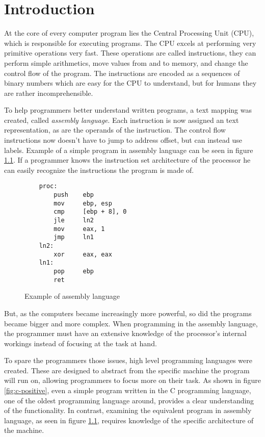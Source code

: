 \chapter{Introduction}
At the core of every computer program lies the Central Processing Unit (CPU),
which is responsible for executing programs. The CPU excels at performing very
primitive operations very fast. These operations are called instructions, they
can perform simple arithmetics, move values from and to memory, and change the
control flow of the program. The instructions are encoded as a sequences of
binary numbers which are easy for the CPU to understand, but for humans they
are rather incomprehensible.

To help programmers better understand written programs, a text mapping was
created, called \textit{assembly language}. Each instruction is now assigned an
text representation, as are the operands of the instruction. The control flow
instructions now doesn't have to jump to address offset, but can instead use
labels. Example of a simple program in assembly language can be seen in figure
\ref{fig:simple-assembly}. If a programmer knows the instruction set
architecture of the processor he can easily recognize the instructions the
program is made of.

\begin{figure}
    \begin{lstlisting}
    proc:
        push    ebp
        mov     ebp, esp
        cmp     [ebp + 8], 0
        jle     ln2
        mov     eax, 1
        jmp     ln1
    ln2:
        xor     eax, eax
    ln1:
        pop     ebp
        ret
    \end{lstlisting}
    \caption{Example of assembly language}
    \label{fig:simple-assembly}
\end{figure}

But, as the computers became increasingly more powerful, so did the programs
became bigger and more complex. When programming in the assembly language,
the programmer must have an extensive knowledge of the processor's internal
workings instead of focusing at the task at hand.

To spare the programmers those issues, high level programming languages were
created. These are designed to abstract from the specific machine the program
will run on, allowing programmers to focus more on their task. As shown in
figure \ref{fig:c-positive}, even a simple program written in the C programming
language, one of the oldest programming language around, provides a clear
understanding of the functionality. In contrast, examining the equivalent
program in assembly language, as seen in figure \ref{fig:simple-assembly},
requires knowledge of the specific architecture of the machine.

